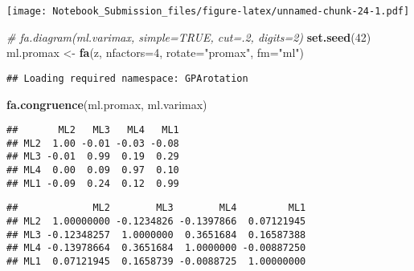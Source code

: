 \documentclass[
]{article}
\newenvironment{Shaded}{\begin{snugshade}}{\end{snugshade}}
\newcommand{\CommentTok}[1]{\textcolor[rgb]{0.56,0.35,0.01}{\textit{#1}}}
\newcommand{\DataTypeTok}[1]{\textcolor[rgb]{0.13,0.29,0.53}{#1}}
\newcommand{\DecValTok}[1]{\textcolor[rgb]{0.00,0.00,0.81}{#1}}
\newcommand{\KeywordTok}[1]{\textcolor[rgb]{0.13,0.29,0.53}{\textbf{#1}}}
\newcommand{\NormalTok}[1]{#1}
\newcommand{\OperatorTok}[1]{\textcolor[rgb]{0.81,0.36,0.00}{\textbf{#1}}}
\newcommand{\StringTok}[1]{\textcolor[rgb]{0.31,0.60,0.02}{#1}}
\begin{document}
\texttt{[image: Notebook\_Submission\_files/figure-latex/unnamed-chunk-24-1.pdf]}

\begin{Shaded}
\begin{Highlighting}[]
\CommentTok{# fa.diagram(ml.varimax, simple=TRUE, cut=.2, digits=2)}
\KeywordTok{set.seed}\NormalTok{(}\DecValTok{42}\NormalTok{)}
\NormalTok{ml.promax <-}\StringTok{ }\KeywordTok{fa}\NormalTok{(z, }\DataTypeTok{nfactors=}\DecValTok{4}\NormalTok{, }\DataTypeTok{rotate=}\StringTok{"promax"}\NormalTok{, }\DataTypeTok{fm=}\StringTok{"ml"}\NormalTok{)}
\end{Highlighting}
\end{Shaded}

\begin{verbatim}
## Loading required namespace: GPArotation
\end{verbatim}

\begin{Shaded}
\begin{Highlighting}[]
\KeywordTok{fa.congruence}\NormalTok{(ml.promax, ml.varimax)}
\end{Highlighting}
\end{Shaded}

\begin{verbatim}
##       ML2   ML3   ML4   ML1
## ML2  1.00 -0.01 -0.03 -0.08
## ML3 -0.01  0.99  0.19  0.29
## ML4  0.00  0.09  0.97  0.10
## ML1 -0.09  0.24  0.12  0.99
\end{verbatim}

\begin{Shaded}
\end{Shaded}

\begin{verbatim}
##             ML2        ML3        ML4         ML1
## ML2  1.00000000 -0.1234826 -0.1397866  0.07121945
## ML3 -0.12348257  1.0000000  0.3651684  0.16587388
## ML4 -0.13978664  0.3651684  1.0000000 -0.00887250
## ML1  0.07121945  0.1658739 -0.0088725  1.00000000
\end{verbatim}

\begin{Shaded}
\end{Shaded}
\end{document}
